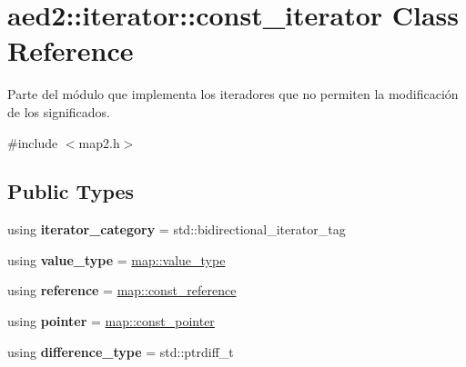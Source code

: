 \hypertarget{classaed2_1_1iterator_1_1const__iterator}{}\section{aed2\+:\+:iterator\+:\+:const\+\_\+iterator Class Reference}
\label{classaed2_1_1iterator_1_1const__iterator}


Parte del módulo que implementa los iteradores que no permiten la modificación de los significados.  




{\ttfamily \#include $<$map2.\+h$>$}

\subsection*{Public Types}
\begin{DoxyCompactItemize}
\item 
\mbox{\label{classaed2_1_1iterator_1_1const__iterator_a0081a05e065b4fa9f489f5bd2a252fe2}} 
using {\bfseries iterator\+\_\+category} = std\+::bidirectional\+\_\+iterator\+\_\+tag
\item 
\mbox{\label{classaed2_1_1iterator_1_1const__iterator_a47f035bb6b420788be00cc9b968cbd5d}} 
using {\bfseries value\+\_\+type} = \hyperlink{classaed2_1_1map_a719db98e0ff9a837610f76be33264680}{map\+::value\+\_\+type}
\item 
\mbox{\label{classaed2_1_1iterator_1_1const__iterator_a957d8873a18f579efb4210f1640ad83b}} 
using {\bfseries reference} = \hyperlink{classaed2_1_1map_a277080d3db76f19df9319ecba16475a9}{map\+::const\+\_\+reference}
\item 
\mbox{\label{classaed2_1_1iterator_1_1const__iterator_a629690353abe9f4b60d38e990c1f4f76}} 
using {\bfseries pointer} = \hyperlink{classaed2_1_1map_a1366fc3e227a49777cb748fc6d4e022b}{map\+::const\+\_\+pointer}
\item 
\mbox{\label{classaed2_1_1iterator_1_1const__iterator_a48c8db849a8f9ddffddd596bc2caff80}} 
using {\bfseries difference\+\_\+type} = std\+::ptrdiff\+\_\+t
\end{DoxyCompactItemize}
